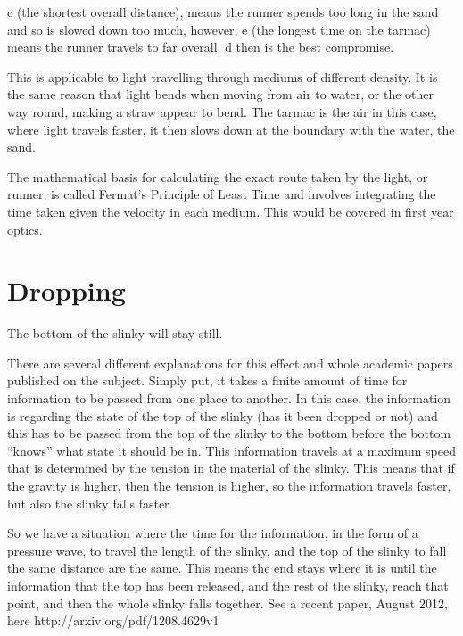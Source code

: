 c (the shortest overall distance), means the runner spends too long in the sand and so is slowed down too much, however, e (the longest time on the tarmac) means the runner travels to far overall. d then is the best compromise.

This is applicable to light travelling through mediums of different density. It is the same reason that light bends when moving from air to water, or the other way round, making a straw appear to bend. The tarmac is the air in this case, where light travels faster, it then slows down at the boundary with the water, the sand.

The mathematical basis for calculating the exact route taken by the light, or runner, is called Fermat's Principle of Least Time and involves integrating the time taken given the velocity in each medium. This would be covered in first year optics.

\section{Dropping}
The bottom of the slinky will stay still. 

There are several different explanations for this effect and whole academic papers published on the subject. Simply put, it takes a finite amount of time for information to be passed from one place to another. In this case, the information is regarding the state of the top of the slinky (has it been dropped or not) and this has to be passed from the top of the slinky to the bottom before the bottom ``knows'' what state it should be in. This information travels at a maximum speed that is determined by the tension in the material of the slinky. This means that if the gravity is higher, then the tension is higher, so the information travels faster, but also the slinky falls faster.

So we have a situation where the time for the information, in the form of a pressure wave, to travel the length of the slinky, and the top of the slinky to fall the same distance are the same. This means the end stays where it is until the information that the top has been released, and the rest of the slinky, reach that point, and then the whole slinky falls together. See a recent paper, August 2012, here http://arxiv.org/pdf/1208.4629v1

